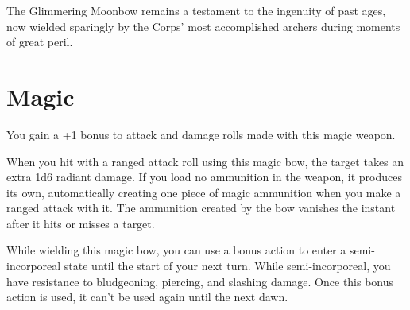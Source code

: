 The Glimmering Moonbow remains a testament to the ingenuity of past ages, now wielded sparingly by the Corps' most accomplished archers during moments of great peril.

\section*{Magic}
You gain a +1 bonus to attack and damage rolls made with this magic weapon.

When you hit with a ranged attack roll using this magic bow, the target takes an extra 1d6 radiant damage. If you load no ammunition in the weapon, it produces its own, automatically creating one piece of magic ammunition when you make a ranged attack with it. The ammunition created by the bow vanishes the instant after it hits or misses a target.

While wielding this magic bow, you can use a bonus action to enter a semi-incorporeal state until the start of your next turn. While semi-incorporeal, you have resistance to bludgeoning, piercing, and slashing damage. Once this bonus action is used, it can't be used again until the next dawn.